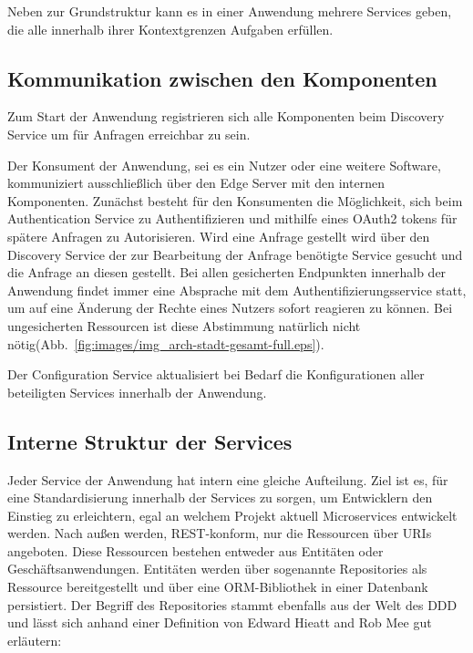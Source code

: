 \documentclass[12pt,a4paper,bibliography=totocnumbered,listof=totocnumbered]{scrartcl}
\begin{document}
Neben zur Grundstruktur kann es in einer Anwendung mehrere Services geben, die alle innerhalb ihrer Kontextgrenzen Aufgaben erfüllen. 


\subsection{Kommunikation zwischen den Komponenten}

Zum Start der Anwendung registrieren sich alle Komponenten beim Discovery Service um für Anfragen erreichbar zu sein.

Der Konsument der Anwendung, sei es ein Nutzer oder eine weitere Software, kommuniziert ausschließlich über den Edge Server mit den internen Komponenten. Zunächst besteht für den Konsumenten die Möglichkeit, sich beim Authentication Service zu Authentifizieren und mithilfe eines OAuth2 tokens für spätere Anfragen zu Autorisieren. Wird eine Anfrage gestellt wird über den Discovery Service der zur Bearbeitung der Anfrage benötigte Service gesucht und die Anfrage an diesen gestellt. Bei allen gesicherten Endpunkten innerhalb der Anwendung findet immer eine Absprache mit dem Authentifizierungsservice statt, um auf eine Änderung der Rechte eines Nutzers sofort reagieren zu können. Bei ungesicherten Ressourcen ist diese Abstimmung natürlich nicht nötig(Abb.~\ref{fig:images/img_arch-stadt-gesamt-full.eps}).

Der Configuration Service aktualisiert bei Bedarf die Konfigurationen aller beteiligten Services innerhalb der Anwendung.


\subsection{Interne Struktur der Services}

Jeder Service der Anwendung hat intern eine gleiche Aufteilung. Ziel ist es, für eine Standardisierung innerhalb der Services zu sorgen, um Entwicklern den Einstieg zu erleichtern, egal an welchem Projekt aktuell Microservices entwickelt werden. Nach außen werden, REST-konform, nur die Ressourcen über \acp{URI} angeboten. Diese Ressourcen bestehen entweder aus Entitäten oder Geschäftsanwendungen. Entitäten werden über sogenannte Repositories als Ressource bereitgestellt und über eine \ac{ORM}-Bibliothek in einer Datenbank persistiert. Der Begriff des Repositories stammt ebenfalls aus der Welt des \ac{DDD} und lässt sich anhand einer Definition von Edward Hieatt and Rob Mee gut erläutern\cite{hieatt}:
\end{document}
